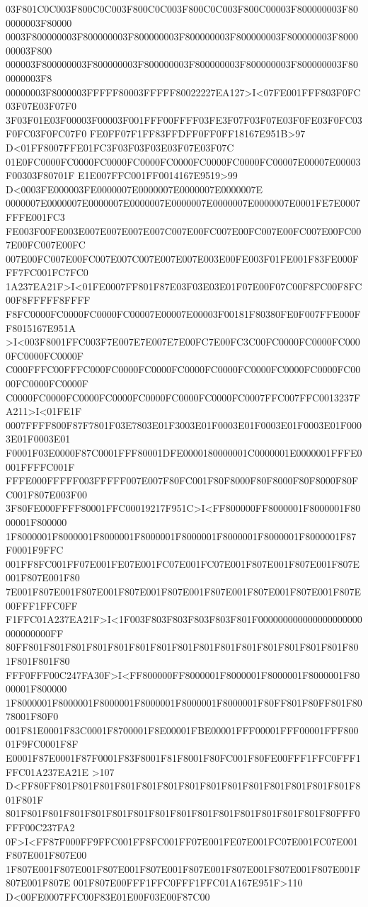 03F801C0C003F800C0C003F800C0C003F800C0C003F800C00003F800000003F800000003F80000
0003F800000003F800000003F800000003F800000003F800000003F800000003F800000003F800
000003F800000003F800000003F800000003F800000003F800000003F800000003F800000003F8
00000003F8000003FFFFF80003FFFFF80022227EA127>I<07FE001FFF803F0FC03F07E03F07F0
3F03F01E03F00003F00003F001FFF00FFFF03FE3F07F03F07E03F0FE03F0FC03F0FC03F0FC07F0
FE0FF07F1FF83FFDFF0FF0FF18167E951B>97 D<01FF8007FFE01FC3F03F03F03E03F07E03F07C
01E0FC0000FC0000FC0000FC0000FC0000FC0000FC0000FC00007E00007E00003F00303F80701F
E1E007FFC001FF0014167E9519>99 D<0003FE000003FE0000007E0000007E0000007E0000007E
0000007E0000007E0000007E0000007E0000007E0000007E0000007E0001FE7E0007FFFE001FC3
FE003F00FE003E007E007E007E007C007E00FC007E00FC007E00FC007E00FC007E00FC007E00FC
007E00FC007E00FC007E007C007E007E007E003E00FE003F01FE001F83FE000FFF7FC001FC7FC0
1A237EA21F>I<01FE0007FF801F87E03F03E03E01F07E00F07C00F8FC00F8FC00F8FFFFF8FFFF
F8FC0000FC0000FC0000FC00007E00007E00003F00181F80380FE0F007FFE000FF8015167E951A
>I<003F8001FFC003F7E007E7E007E7E00FC7E00FC3C00FC0000FC0000FC0000FC0000FC0000F
C000FFFC00FFFC000FC0000FC0000FC0000FC0000FC0000FC0000FC0000FC0000FC0000FC0000F
C0000FC0000FC0000FC0000FC0000FC0000FC0000FC0007FFC007FFC0013237FA211>I<01FE1F
0007FFFF800F87F7801F03E7803E01F3003E01F0003E01F0003E01F0003E01F0003E01F0003E01
F0001F03E0000F87C0001FFF80001DFE0000180000001C0000001E0000001FFFE0001FFFFC001F
FFFE000FFFFF003FFFFF007E007F80FC001F80F8000F80F8000F80F8000F80FC001F807E003F00
3F80FE000FFFF80001FFC00019217F951C>I<FF800000FF8000001F8000001F8000001F800000
1F8000001F8000001F8000001F8000001F8000001F8000001F8000001F8000001F87F0001F9FFC
001FF8FC001FF07E001FE07E001FC07E001FC07E001F807E001F807E001F807E001F807E001F80
7E001F807E001F807E001F807E001F807E001F807E001F807E001F807E001F807E00FFF1FFC0FF
F1FFC01A237EA21F>I<1F003F803F803F803F803F801F000000000000000000000000000000FF
80FF801F801F801F801F801F801F801F801F801F801F801F801F801F801F801F801F801F801F80
FFF0FFF00C247FA30F>I<FF800000FF8000001F8000001F8000001F8000001F8000001F800000
1F8000001F8000001F8000001F8000001F8000001F8000001F80FF801F80FF801F8078001F80F0
001F81E0001F83C0001F8700001F8E00001FBE00001FFF00001FFF00001FFF80001F9FC0001F8F
E0001F87E0001F87F0001F83F8001F81F8001F80FC001F80FE00FFF1FFC0FFF1FFC01A237EA21E
>107 D<FF80FF801F801F801F801F801F801F801F801F801F801F801F801F801F801F801F801F
801F801F801F801F801F801F801F801F801F801F801F801F801F801F801F80FFF0FFF00C237FA2
0F>I<FF87F000FF9FFC001FF8FC001FF07E001FE07E001FC07E001FC07E001F807E001F807E00
1F807E001F807E001F807E001F807E001F807E001F807E001F807E001F807E001F807E001F807E
001F807E00FFF1FFC0FFF1FFC01A167E951F>110 D<00FE0007FFC00F83E01E00F03E00F87C00
